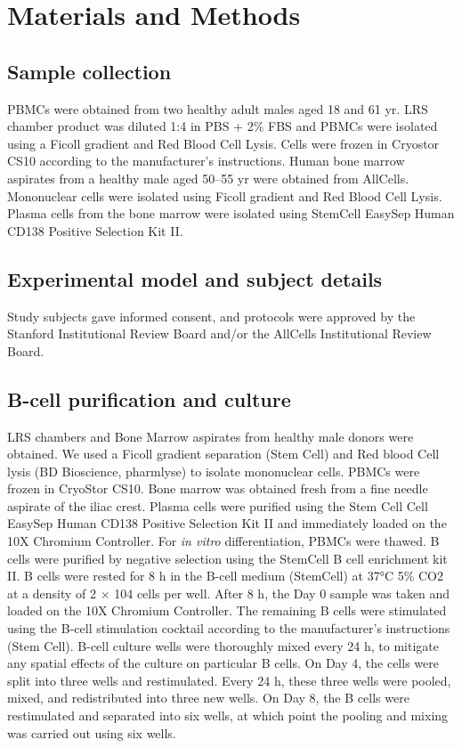 \section{Materials and Methods}
\subsection{Sample collection}

PBMCs were obtained from two healthy adult males aged 18 and 61 yr. LRS chamber product was diluted 1:4 in PBS + 2\% FBS and PBMCs were isolated using a Ficoll gradient and Red Blood Cell Lysis. Cells were frozen in Cryostor CS10 according to the manufacturer’s instructions. Human bone marrow aspirates from a healthy male aged 50–55 yr were obtained from AllCells. Mononuclear cells were isolated using Ficoll gradient and Red Blood Cell Lysis. Plasma cells from the bone marrow were isolated using StemCell EasySep Human CD138 Positive Selection Kit II.

\subsection{Experimental model and subject details}
Study subjects gave informed consent, and protocols were approved by the Stanford Institutional Review Board and/or the AllCells Institutional Review Board.
\subsection{B-cell purification and culture}
LRS chambers and Bone Marrow aspirates from healthy male donors were obtained. We used a Ficoll gradient separation (Stem Cell) and Red blood Cell lysis (BD Bioscience, pharmlyse) to isolate mononuclear cells. PBMCs were frozen in CryoStor CS10. Bone marrow was obtained fresh from a fine needle aspirate of the iliac crest. Plasma cells were purified using the Stem Cell Cell EasySep Human CD138 Positive Selection Kit II and immediately loaded on the 10X Chromium Controller. For \textit{in vitro} differentiation, PBMCs were thawed. B cells were purified by negative selection using the StemCell B cell enrichment kit II. B cells were rested for 8 h in the B-cell medium (StemCell) at 37°C 5\% CO2 at a density of 2 × 104 cells per well. After 8 h, the Day 0 sample was taken and loaded on the 10X Chromium Controller. The remaining B cells were stimulated using the B-cell stimulation cocktail according to the manufacturer’s instructions (Stem Cell). B-cell culture wells were thoroughly mixed every 24 h, to mitigate any spatial effects of the culture on particular B cells. On Day 4, the cells were split into three wells and restimulated. Every 24 h, these three wells were pooled, mixed, and redistributed into three new wells. On Day 8, the B cells were restimulated and separated into six wells, at which point the pooling and mixing was carried out using six wells.
